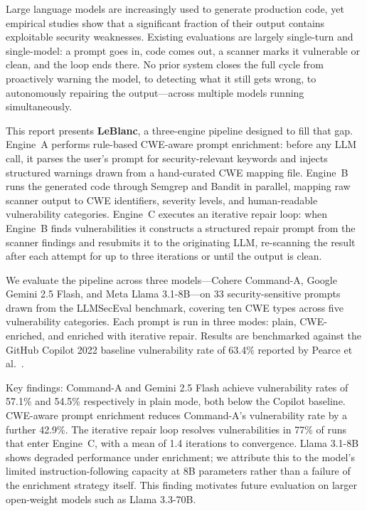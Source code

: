 \documentclass[12pt,a4paper]{report}
\begin{document}
\vspace{0.2in}
\noindent Large language models are increasingly used to generate production code,
yet empirical studies show that a significant fraction of their output contains
exploitable security weaknesses. Existing evaluations are largely single-turn and
single-model: a prompt goes in, code comes out, a scanner marks it vulnerable or
clean, and the loop ends there. No prior system closes the full cycle from
proactively warning the model, to detecting what it still gets wrong, to
autonomously repairing the output---across multiple models running simultaneously.

\vspace{0.15in}
\noindent This report presents \textbf{LeBlanc}, a three-engine pipeline designed
to fill that gap. Engine~A performs rule-based CWE-aware prompt enrichment: before
any LLM call, it parses the user's prompt for security-relevant keywords and
injects structured warnings drawn from a hand-curated CWE mapping file.
Engine~B runs the generated code through Semgrep and Bandit in parallel, mapping
raw scanner output to CWE identifiers, severity levels, and human-readable
vulnerability categories. Engine~C executes an iterative repair loop: when
Engine~B finds vulnerabilities it constructs a structured repair prompt from the
scanner findings and resubmits it to the originating LLM, re-scanning the result
after each attempt for up to three iterations or until the output is clean.

\vspace{0.15in}
\noindent We evaluate the pipeline across three models---Cohere Command-A,
Google Gemini 2.5 Flash, and Meta Llama 3.1-8B---on 33 security-sensitive prompts
drawn from the LLMSecEval benchmark, covering ten CWE types across five
vulnerability categories. Each prompt is run in three modes: plain, CWE-enriched,
and enriched with iterative repair. Results are benchmarked against the GitHub
Copilot 2022 baseline vulnerability rate of 63.4\% reported by Pearce et
al.~\cite{pearce2022asleep}.

\vspace{0.15in}
\noindent Key findings: Command-A and Gemini 2.5 Flash achieve vulnerability rates
of 57.1\% and 54.5\% respectively in plain mode, both below the Copilot baseline.
CWE-aware prompt enrichment reduces Command-A's vulnerability rate by a further
42.9\%. The iterative repair loop resolves vulnerabilities in 77\% of runs that
enter Engine~C, with a mean of 1.4 iterations to convergence. Llama 3.1-8B shows
degraded performance under enrichment; we attribute this to the model's limited
instruction-following capacity at 8B parameters rather than a failure of the
enrichment strategy itself. This finding motivates future evaluation on larger
open-weight models such as Llama 3.3-70B.
\end{document}
